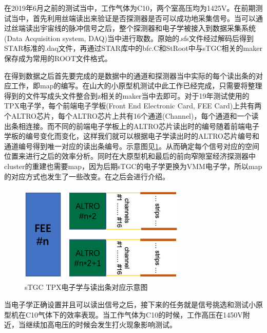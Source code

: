 在2019年6月之前的测试当中，工作气体为C10，两个室高压均为1425V。在前期测试当中，首先利用丝端读出来验证是否探测器是否可以成功地采集信号。当可以通过丝端读出宇宙线的脉冲信号之后，整个探测器和电子学被接入到数据采集系统(Data Acquisition system, DAQ)当中进行取数。原始的.sfs文件经过解码后得到STAR标准的.daq文件，再通过STAR库中的bfc.C和StRoot中与sTGC相关的maker保存成为常用的ROOT文件格式。

在得到数据之后首先要完成的是数据中的通道和探测器当中实际的每个读出条的对应工作，即map的编写。在山大的小原型机测试中此工作已经完成，只需要将整理得到的文件写成头文件整合到z相关的maker当中去即可。对于19年测试使用的TPX电子学，每个前端电子学板(Front End Electronic Card, FEE Card)上共有两个ALTRO芯片，每个ALTRO芯片上共有16个通道(Channel)，每个通道和一个读出条相连接。而不同的前端电子学板上的ALTRO芯片读出时的编号随着前端电子学板的编号变化而变化，这样我们就可以根据电子学读出时的ALTRO芯片编号和通道编号得到唯一对应的读出条编号。示意图见\ref{fig:TPX_map}。从而确定每个信号对应的空间位置来进行之后的效率分析。同时在大原型机和最后的前向窄隙室经济探测器中cluster的重建也需要map，因为后期sTGC的电子学更换为VMM电子学，所以map的对应方式也发生了一些改变。在之后会进行介绍。
\begin{figure}[htb]
    \begin{center}
    \includegraphics[width=0.7\textwidth,clip]{figures/Chapter3/TPX_map.png}
    \end{center}
    \caption[sTGC TPX电子学与读出条对应示意图]{sTGC TPX电子学与读出条对应示意图}
    \label{fig:TPX_map}
\end{figure}

当电子学正确设置并且可以读出信号之后，接下来的任务就是信号挑选和测试小原型机在C10气体下的效率表现。当工作气体为C10的时候，工作高压在1450V附近，当继续加高电压的时候会发生打火现象影响测试。

